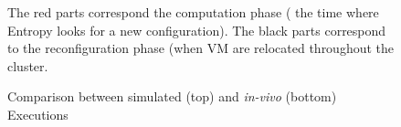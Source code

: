 \begin{figure}
\centering
\vspace*{-.7cm}
 \subcapcentertrue
{}
\vspace*{-.8cm}
\caption{Comparison between simulated (top) and \textit{in-vivo}
  (bottom) Executions}
\flushleft\scriptsize{The red parts correspond the computation phase (\ie
  the time where Entropy looks for a new configuration). The black parts correspond to the reconfiguration phase (\ie when
VM are relocated throughout the cluster.}
\label{fig:usecase-vivosimu}
\vspace*{-.7cm}
\end{figure}
